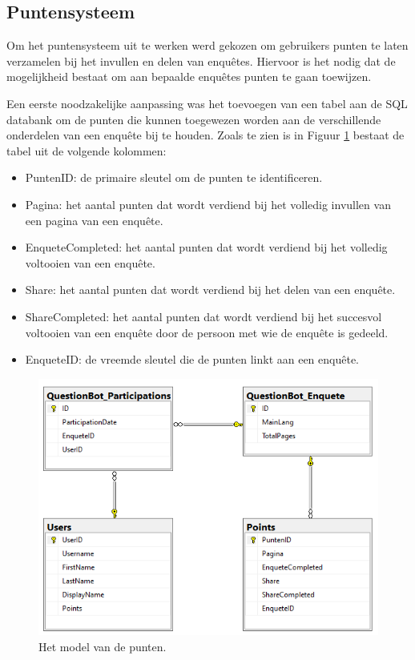\subsection{Puntensysteem}

Om het puntensysteem uit te werken werd gekozen om gebruikers punten te laten verzamelen bij het invullen en delen van enquêtes. Hiervoor is het nodig dat de mogelijkheid bestaat om aan bepaalde enquêtes punten te gaan toewijzen.

Een eerste noodzakelijke aanpassing was het toevoegen van een tabel aan de SQL databank om de punten die kunnen toegewezen worden aan de verschillende onderdelen van een enquête bij te houden. Zoals te zien is in Figuur \ref{fig:dbdiagram} bestaat de tabel uit de volgende kolommen:

\begin{itemize}
    \item PuntenID: de primaire sleutel om de punten te identificeren.
    \item Pagina: het aantal punten dat wordt verdiend bij het volledig invullen van een pagina van een enquête.
    \item EnqueteCompleted: het aantal punten dat wordt verdiend bij het volledig voltooien van een enquête.
    \item Share: het aantal punten dat wordt verdiend bij het delen van een enquête.
    \item ShareCompleted: het aantal punten dat wordt verdiend bij het succesvol voltooien van een enquête door de persoon met wie de enquête is gedeeld.
    \item EnqueteID: de vreemde sleutel die de punten linkt aan een enquête.
\end{itemize}

\begin{figure}
    \includegraphics[width=\linewidth]{DBDiagram.png}
    \caption{Het model van de punten.}
    \label{fig:dbdiagram}
\end{figure}

